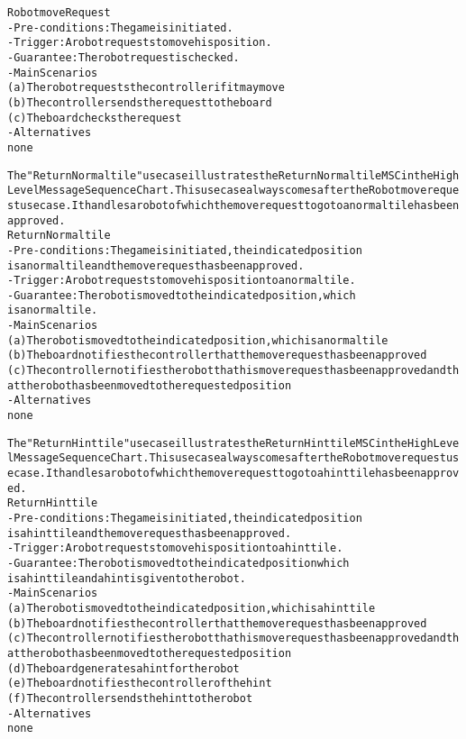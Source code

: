 \begin{alltt}
Robot move Request
- Pre-conditions: The game is initiated.
- Trigger: A robot requests to move his position.
- Guarantee: The robot request is checked.
- Main Scenarios
    (a) The robot requests the controller if it may move
    (b) The controller sends the request to the board
    (c) The board checks the request
- Alternatives \\
    none

The "Return Normal tile" use case illustrates the Return Normal tile MSC in the High Level Message Sequence Chart. This use case always comes after the Robot move request use case. It handles a robot of which the move request to go to a normal tile has been approved. \\

Return Normal tile
- Pre-conditions: The game is initiated, the indicated position
    is a normal tile and the move request has been approved.
- Trigger: A robot requests to move his position to a normal tile.
- Guarantee: The robot is moved to the indicated position, which
    is a normal tile.
- Main Scenarios
    (a) The robot is moved to the indicated position, which is a normal tile
    (b) The board notifies the controller that the move request has been approved
    (c) The controller notifies the robot that his move request has been approved and that the robot has been moved to the requested position
- Alternatives \\
    none

The "Return Hint tile" use case illustrates the Return Hint tile MSC in the High Level Message Sequence Chart. This use case always comes after the Robot move request use case. It handles a robot of which the move request to go to a hint tile has been approved. \\

Return Hint tile
- Pre-conditions: The game is initiated, the indicated position
    is a hint tile and the move request has been approved.
- Trigger: A robot requests to move his position to a hint tile.
- Guarantee: The robot is moved to the indicated position which
    is a hint tile and a hint is given to the robot.
- Main Scenarios
    (a) The robot is moved to the indicated position, which is a hint tile
    (b) The board notifies the controller that the move request has been approved
    (c) The controller notifies the robot that his move request has been approved and that the robot has been moved to the requested position
    (d) The board generates a hint for the robot
    (e) The board notifies the controller of the hint
    (f) The controller sends the hint to the robot
- Alternatives \\
    none


\end{alltt}
